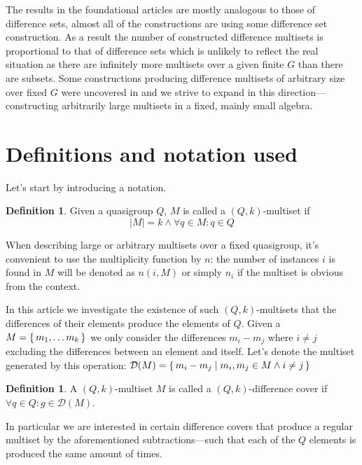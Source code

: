 \documentclass{article}
\theoremstyle{plain}
\theoremstyle{definition}
\newtheorem{definition}[theorem]{Definition}
\theoremstyle{remark}
\begin{document}
        The results in the foundational articles are mostly analogous to those of difference sets, almost all of the constructions are using some difference set construction. As a result the number of constructed difference multisets is proportional to that of difference sets which is unlikely to reflect the real situation as there are infinitely more multisets over a given finite $G$ than there are subsets. Some constructions producing difference multisets of arbitrary size over fixed $G$ were uncovered in \cite{momihara2009strong} and we strive to expand in this direction---constructing arbitrarily large multisets in a fixed, mainly small algebra.
    
	\section{Definitions and notation used}
    
        Let's start by introducing a notation.
        
		\begin{definition}
			\label{dms:def:ms}
			Given a quasigroup $Q$, $M$ is called a $(Q,k)$-multiset if
			\begin{equation}
				|M| = k \land \forall q \in M \colon q \in Q
			\end{equation}
		\end{definition}
	
		When describing large or arbitrary multisets over a fixed quasigroup, it's convenient to use the multiplicity function by $n$: the number of instances $i$ is found in $M$ will be denoted as $n(i,M)$ or simply $n_i$ if the multiset is obvious from the context.
	
		In this article we investigate the existence of such $(Q,k)$-multisets that the differences of their elements produce the elements of $Q$. Given a $M=\set{m_1,\ldots m_k}$ we only consider the differences $m_i-m_j$ where $i \neq j$ excluding the differences between an element and itself. Let's denote the multiset generated by this operation: $\mathcal D (M) = \set{m_i-m_j \mid m_i, m_j \in M \land i \neq j}$
	
		\begin{definition}
			\label{dms:def:dc}
			A $(Q,k)$-multiset $M$ is called a $(Q,k)$-difference cover if $\forall q \in Q \colon g \in \mathcal D(M)$.
		\end{definition}
		
		In particular we are interested in certain difference covers that produce a regular multiset by the aforementioned subtractions---such that each of the $Q$ elements is produced the same amount of times.
		
\end{document}
